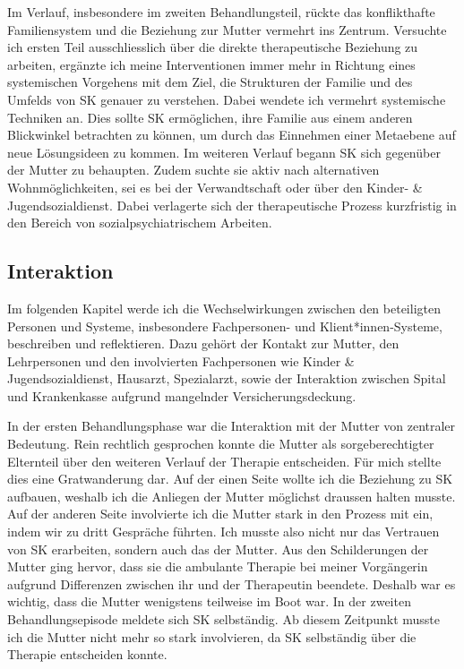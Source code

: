 Im Verlauf, insbesondere im zweiten Behandlungsteil, rückte das konflikthafte Familiensystem und die Beziehung zur Mutter vermehrt ins Zentrum. Versuchte ich ersten Teil ausschliesslich über die direkte therapeutische Beziehung zu arbeiten, ergänzte ich meine Interventionen immer mehr in Richtung eines systemischen Vorgehens mit dem Ziel, die Strukturen der Familie und des Umfelds von SK genauer zu verstehen. Dabei wendete ich vermehrt systemische Techniken an. Dies sollte SK ermöglichen, ihre Familie aus einem anderen Blickwinkel betrachten zu können, um durch das Einnehmen einer Metaebene auf neue Lösungsideen zu kommen. Im weiteren Verlauf begann SK sich gegenüber der Mutter zu behaupten. Zudem suchte sie aktiv nach alternativen Wohnmöglichkeiten, sei es bei der Verwandtschaft oder über den Kinder- \& Jugendsozialdienst. Dabei verlagerte sich der therapeutische Prozess kurzfristig in den Bereich von sozialpsychiatrischem Arbeiten. 


\subsection{Interaktion} \label{sc:interaktion}
Im folgenden Kapitel werde ich die Wechselwirkungen zwischen den beteiligten Personen und Systeme, insbesondere Fachpersonen- und Klient*innen-Systeme, beschreiben und reflektieren. Dazu gehört der Kontakt zur Mutter, den Lehrpersonen und den involvierten Fachpersonen wie Kinder \& Jugendsozialdienst, Hausarzt, Spezialarzt, sowie der Interaktion zwischen Spital und Krankenkasse aufgrund mangelnder Versicherungsdeckung.

In der ersten Behandlungsphase war die Interaktion mit der Mutter von zentraler Bedeutung. Rein rechtlich gesprochen konnte die Mutter als sorgeberechtigter Elternteil über den weiteren Verlauf der Therapie entscheiden. Für mich stellte dies eine Gratwanderung dar. Auf der einen Seite wollte ich die Beziehung zu SK aufbauen, weshalb ich die Anliegen der Mutter möglichst draussen halten musste. Auf der anderen Seite involvierte ich die Mutter stark in den Prozess mit ein, indem wir zu dritt Gespräche führten. Ich musste also nicht nur das Vertrauen von SK erarbeiten, sondern auch das der Mutter. Aus den Schilderungen der Mutter ging hervor, dass sie die ambulante Therapie bei meiner Vorgängerin aufgrund Differenzen zwischen ihr und der Therapeutin beendete. Deshalb war es wichtig, dass die Mutter wenigstens teilweise im Boot war. In der zweiten Behandlungsepisode meldete sich SK selbständig. Ab diesem Zeitpunkt musste ich die Mutter nicht mehr so stark involvieren, da SK selbständig über die Therapie entscheiden konnte. 

